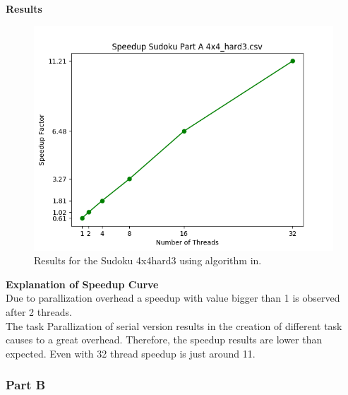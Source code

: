 \documentclass{article}
\newcommand\tab[1][0.5cm]{\hspace*{#1}}
\begin{document}
\textbf{Results}
 \begin{figure}[!htb]
    \centering
        \includegraphics[width=0.8\linewidth]{./img/speedup_part_2_A.png}
        \caption{\small Results for the Sudoku 4x4hard3 using algorithm in.}
\end{figure}                

\textbf{Explanation of Speedup Curve}\\
\tab Due to parallization overhead a speedup with value bigger than 1 is observed after 2 threads. \\
\tab The task Parallization of serial version results in the creation of different task
causes to a great overhead.
Therefore, the speedup results are lower than expected. Even with 32 thread speedup is just around 11.
\newpage

\subsubsection{Part B}
\end{document}
